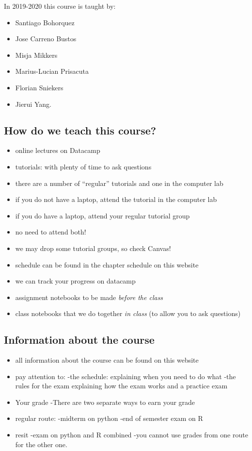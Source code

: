 \documentclass[]{book}
\providecommand{\tightlist}{%
  \setlength{\itemsep}{0pt}\setlength{\parskip}{0pt}}
\begin{document}
In 2019-2020 this course is taught by:

\begin{itemize}
\tightlist
\item
  Santiago Bohorquez
\item
  Jose Carreno Bustos
\item
  Misja Mikkers
\item
  Marius-Lucian Prisacuta
\item
  Florian Sniekers
\item
  Jierui Yang.
\end{itemize}

\hypertarget{how-do-we-teach-this-course}{%
\subsection{How do we teach this course?}\label{how-do-we-teach-this-course}}

\begin{itemize}
\tightlist
\item
  online lectures on Datacamp
\item
  tutorials: with plenty of time to ask questions
\item
  there are a number of ``regular'' tutorials and one in the computer lab
\item
  if you do not have a laptop, attend the tutorial in the computer lab
\item
  if you do have a laptop, attend your regular tutorial group
\item
  no need to attend both!
\item
  we may drop some tutorial groups, so check Canvas!
\item
  schedule can be found in the chapter schedule on this website
\item
  we can track your progress on datacamp
\item
  assignment notebooks to be made \emph{before the class}
\item
  class notebooks that we do together \emph{in class} (to allow you to ask questions)
\end{itemize}

\hypertarget{information-about-the-course}{%
\subsection{Information about the course}\label{information-about-the-course}}

\begin{itemize}
\item
  all information about the course can be found on this website
\item
  pay attention to:
  -the schedule: explaining when you need to do what
  -the rules for the exam explaining how the exam works and a practice exam
\item
  Your grade
  -There are two separate ways to earn your grade
\item
  regular route:
  -midterm on python
  -end of semester exam on R
\item
  resit
  -exam on python and R combined
  -you cannot use grades from one route for the other one.
\end{itemize}
\end{document}
